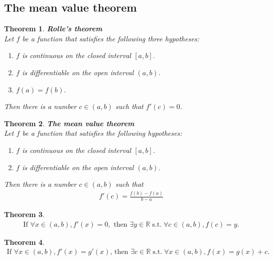 \documentclass{article}
\DeclareMathOperator{\st}{s.t.}
\theoremstyle{sltheorem}
\newtheorem{theorem}{Theorem}[section]
\newcommand{\R}{\mathbb{R}}
\begin{document}
\subsection{The mean value theorem}
\begin{theorem}
    \textbf{Rolle's theorem}\\
    Let $f$ be a function that satisfies the following three hypotheses:
    \begin{enumerate}
        \item $f$ is continuous on the closed interval $[a,b]$.
        \item $f$ is differentiable on the open interval $(a,b)$.
        \item $f(a)=f(b)$.
    \end{enumerate}
    Then there is a number $c \in (a,b)$ such that $f'(c)=0$.
\end{theorem}
\begin{theorem}
    \textbf{The mean value theorem}\\
    Let $f$ be a function that satisfies the following hypotheses:
    \begin{enumerate}
        \item $f$ is continuous on the closed interval $[a,b]$.
        \item $f$ is differentiable on the open interval $(a,b)$.
    \end{enumerate}
    Then there is a number $c\in(a,b)$ such that
    \begin{align*}
        f'(c)=\frac{f(b)-f(a)}{b-a}
    \end{align*}
\end{theorem}
\begin{theorem}
    \begin{align*}
        \text{If }
        \forall x\in(a,b), f'(x)=0, 
        \text{ then } 
        \exists y\in\R\st\forall c\in(a,b), f(c)=y.
    \end{align*}
\end{theorem}
\begin{theorem}
    \begin{align*}
        \text{If }\forall x\in(a,b), f'(x)=g'(x)\text{, then } \exists c\in\R \st\forall x\in (a,b), f(x)=g(x)+c.
    \end{align*}
\end{theorem}
\end{document}
